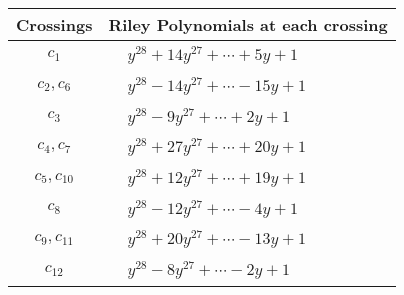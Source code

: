 \documentclass[1p]{elsarticle_modified}
\theoremstyle{definition}
\begin{document}
\begin{tabular}{m{50pt}|m{274pt}}
Crossings & \hspace{64pt}Riley Polynomials at each crossing \\
\hline $$\begin{aligned}c_{1}\end{aligned}$$&$\begin{aligned}
&y^{28}+14 y^{27}+\cdots+5 y+1
\end{aligned}$\\
\hline $$\begin{aligned}c_{2},c_{6}\end{aligned}$$&$\begin{aligned}
&y^{28}-14 y^{27}+\cdots-15 y+1
\end{aligned}$\\
\hline $$\begin{aligned}c_{3}\end{aligned}$$&$\begin{aligned}
&y^{28}-9 y^{27}+\cdots+2 y+1
\end{aligned}$\\
\hline $$\begin{aligned}c_{4},c_{7}\end{aligned}$$&$\begin{aligned}
&y^{28}+27 y^{27}+\cdots+20 y+1
\end{aligned}$\\
\hline $$\begin{aligned}c_{5},c_{10}\end{aligned}$$&$\begin{aligned}
&y^{28}+12 y^{27}+\cdots+19 y+1
\end{aligned}$\\
\hline $$\begin{aligned}c_{8}\end{aligned}$$&$\begin{aligned}
&y^{28}-12 y^{27}+\cdots-4 y+1
\end{aligned}$\\
\hline $$\begin{aligned}c_{9},c_{11}\end{aligned}$$&$\begin{aligned}
&y^{28}+20 y^{27}+\cdots-13 y+1
\end{aligned}$\\
\hline $$\begin{aligned}c_{12}\end{aligned}$$&$\begin{aligned}
&y^{28}-8 y^{27}+\cdots-2 y+1
\end{aligned}$\\
\hline
\end{tabular}\\~\\
\end{document}
